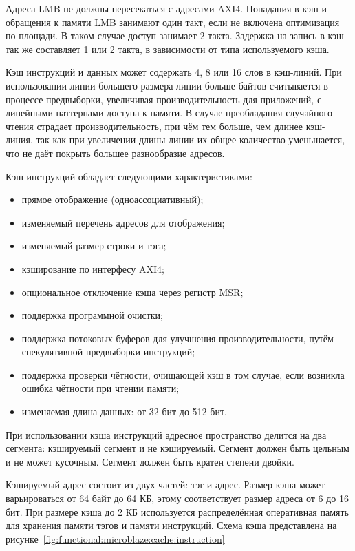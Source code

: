 Адреса LMB не должны пересекаться с адресами AXI4.
Попадания в кэш и обращения к памяти LMB занимают один такт, если не включена оптимизация по площади.
В таком случае доступ занимает 2 такта. Задержка на запись в кэш так же составляет 1 или 2 такта,
в зависимости от типа используемого кэша.

Кэш инструкций и данных может содержать 4, 8 или 16 слов в кэш-линий. При использовании линии большего размера
линии больше байтов считывается в процессе предвыборки, увеличивая производительность для приложений, с
линейными паттернами доступа к памяти. В случае преобладания случайного чтения страдает производительность, при чём
тем больше, чем длинее кэш-линия, так как при увеличении длины линии их общее количество уменьшается, что
не даёт покрыть большее разнообразие адресов.

Кэш инструкций обладает следующими характеристиками:
\begin{itemize}
   \item прямое отображение (одноассоциативный);
   \item изменяемый перечень адресов для отображения;
   \item изменяемый размер строки и тэга;
   \item кэширование по интерфесу AXI4;
   \item опциональное отключение кэша через регистр MSR;
   \item поддержка программной очистки;
   \item поддержка потоковых буферов для улучшения производительности,
     путём спекулятивной предвыборки инструкций;
   \item поддержка проверки чётности, очищающей кэш в том случае, если
     возникла ошибка чётности при чтении памяти;
   \item изменяемая длина данных: от 32 бит до 512 бит.
\end{itemize}

При использовании кэша инструкций адресное пространство делится на два сегмента:
кэшируемый сегмент и не кэшируемый. Сегмент должен быть цельным и не может
кусочным. Сегмент должен быть кратен степени двойки.

Кэшируемый адрес состоит из двух частей: тэг и адрес. Размер кэша может
варьироваться от 64 байт до 64 КБ, этому соответствует размер адреса от
6 до 16 бит. При размере кэша до 2 КБ используется распределённая оперативная
память для хранения памяти тэгов и памяти инструкций. Схема кэша представлена
на рисунке~\ref{fig:functional:microblaze:cache:instruction}

